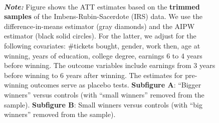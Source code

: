 \documentclass[letterpaper,12pt,leqno]{article}
\begin{document}
\begin{figure}[!ht]
\begin{minipage}[c]{1\textwidth}
\begin{subfigure}{0.45\linewidth}
        \end{subfigure}
    \end{minipage}\\
    \raggedright
     {\footnotesize\textbf{\textit{Note:}} Figure shows the ATT estimates based on the \textbf{trimmed samples} of the Imbens-Rubin-Sacerdote (IRS) data.  We use the difference-in-means estimator (gray diamonds) and the AIPW estimator (black solid circles). For the latter, we adjust for the following covariates: \#tickets bought, gender, work then, age at winning, years of education, college degree, earnings 6 to 4 years before winning. The outcome variables include earnings from 3 years before winning to 6 years after winning.  The estimates for pre-winning outcomes serve as placebo tests. \textbf{Subfigure A}: ``Bigger winners'' versus controls (with ``small winners'' removed from the sample). \textbf{Subfigure B}: Small winners versus controls (with ``big winners'' removed from the sample).}
\end{figure}
\clearpage
\end{document}
